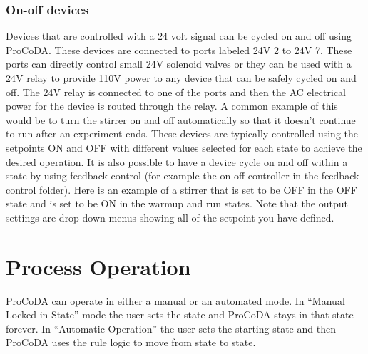 \documentclass[letterpaper,10pt,english]{sphinxmanual}
\begin{document}
\subsubsection{On-off devices}
\label{\detokenize{ProCoDA/ProCoDA:on-off-devices}}\label{\detokenize{ProCoDA/ProCoDA:heading-procoda-on-off-devices}}
Devices that are controlled with a 24 volt signal can be cycled on and off using ProCoDA. These devices are connected to ports labeled 24V 2 to 24V 7. These ports can directly control small 24V solenoid valves or they can be used with a 24V relay to provide 110V power to any device that can be safely cycled on and off. The 24V relay is connected to one of the ports and then the AC electrical power for the device is routed through the relay. A common example of this would be to turn the stirrer on and off automatically so that it doesn’t continue to run after an experiment ends. These devices are typically controlled using the setpoints ON and OFF with different values selected for each state to achieve the desired operation. It is also possible to have a device cycle on and off within a state by using feedback control (for example the on-off controller in the feedback control folder). Here is an example of a stirrer that is set to be OFF in the OFF state and is set to be ON in the warmup and run states. Note that the output settings are drop down menus showing all of the setpoint you have defined.


\section{Process Operation}
\label{\detokenize{ProCoDA/ProCoDA:process-operation}}\label{\detokenize{ProCoDA/ProCoDA:heading-procoda-process-operation}}
ProCoDA can operate in either a manual or an automated mode. In “Manual Locked in State” mode the user sets the state and ProCoDA stays in that state forever. In “Automatic Operation” the user sets the starting state and then ProCoDA uses the rule logic to move from state to state.
\end{document}

